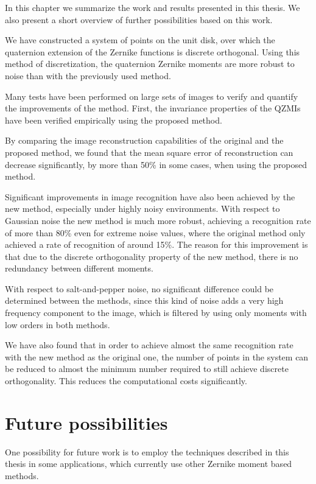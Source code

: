 In this chapter we summarize the work and results presented in this thesis. We also present a short overview of further possibilities based on this work.

We have constructed a system of points on the unit disk, over which the quaternion extension of the Zernike functions is discrete orthogonal. Using this method of discretization, the quaternion Zernike moments are more robust to noise than with the previously used method.

Many tests have been performed on large sets of images to verify and quantify the improvements of the method.
First, the invariance properties of the QZMIs have been verified empirically using the proposed method.

By comparing the image reconstruction capabilities of the original and the proposed method, we found that the mean square error of reconstruction can decrease significantly, by more than 50\% in some cases, when using the proposed method.

Significant improvements in image recognition have also been achieved by the new method, especially under highly noisy environments. With respect to Gaussian noise the new method is much more robust, achieving a recognition rate of more than 80\% even for extreme noise values, where the original method only achieved a rate of recognition of around 15\%. The reason for this improvement is that due to the discrete orthogonality property of the new method, there is no redundancy between different moments.

With respect to salt-and-pepper noise, no significant difference could be determined between the methods, since this kind of noise adds a very high frequency component to the image, which is filtered by using only moments with low orders in both methods.

We have also found that in order to achieve almost the same recognition rate with the new method as the original one, the number of points in the system can be reduced to almost the minimum number required to still achieve discrete orthogonality. This reduces the computational costs significantly. 

\section{Future possibilities}
One possibility for future work is to employ the techniques described in this thesis in some applications, which currently use other Zernike moment based methods.

